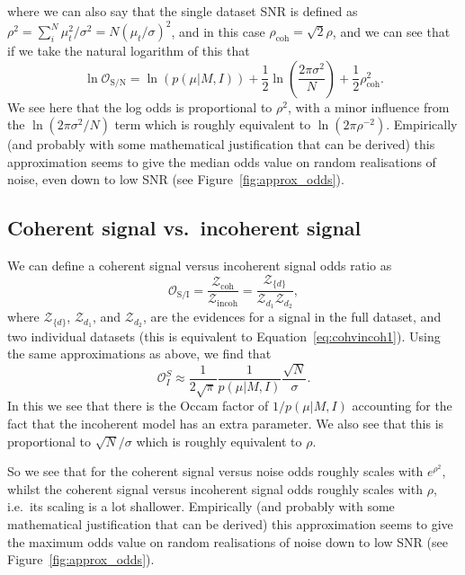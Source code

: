 where we can also say that the single dataset SNR is defined as $\rho^2 = \sum_i^N \mu_t^2/\sigma^2 = N\left(\mu_t/\sigma\right)^2$, and in this case
$\rho_{\text{coh}} = \sqrt{2}\rho$, and we can see that if we take the natural logarithm of this that
\begin{equation}
\ln{\mathcal{O}_{\text{S}/\text{N}}} = \ln{\left(p(\mu|M,I)\right)} + \frac{1}{2}\ln{\left(\frac{2\pi\sigma^2}{N}\right)} + \frac{1}{2}\rho_{\text{coh}}^2.
\end{equation}
We see here that the log odds is proportional to $\rho^2$, with a minor influence from the $\ln{\left(2\pi\sigma^2/N\right)}$ term which is roughly equivalent
to $\ln{\left(2\pi\rho^{-2}\right)}$. Empirically (and probably with some mathematical justification that can be derived) this approximation seems to give the
median odds value on random realisations of noise, even down to low SNR (see Figure~\ref{fig:approx_odds}).

\subsection{Coherent signal vs.\ incoherent signal}

We can define a coherent signal versus incoherent signal odds ratio as
\begin{equation}
\mathcal{O}_{\text{S}/\text{I}} = \frac{\mathcal{Z}_{\text{coh}}}{\mathcal{Z}_{\text{incoh}}} = \frac{\mathcal{Z}_{\{d\}}}{\mathcal{Z}_{d_1}\mathcal{Z}_{d_2}},
\end{equation}
where $\mathcal{Z}_{\{d\}}$, $\mathcal{Z}_{d_1}$, and $\mathcal{Z}_{d_2}$, are the evidences for a signal in the full dataset, and two individual
datasets (this is equivalent to Equation~\ref{eq:cohvincoh1}). Using the same approximations as above, we find that
\begin{equation}
\mathcal{O}^{S}_I \approx \frac{1}{2\sqrt{\pi}}\frac{1}{p(\mu|M,I)}\frac{\sqrt{N}}{\sigma}.
\end{equation}
In this we see that there is the Occam factor of $1/p(\mu|M,I)$ accounting for the fact that the incoherent model has an extra parameter. We also see that this is
proportional to $\sqrt{N}/\sigma$ which is roughly equivalent to $\rho$.

So we see that for the coherent signal versus noise odds roughly scales with $e^{\rho^2}$, whilst the coherent signal versus incoherent signal odds roughly scales with
$\rho$, i.e.\ its scaling is a lot shallower. Empirically (and probably with some mathematical justification that can be derived) this approximation seems to give the
maximum odds value on random realisations of noise down to low SNR (see Figure~\ref{fig:approx_odds}).

